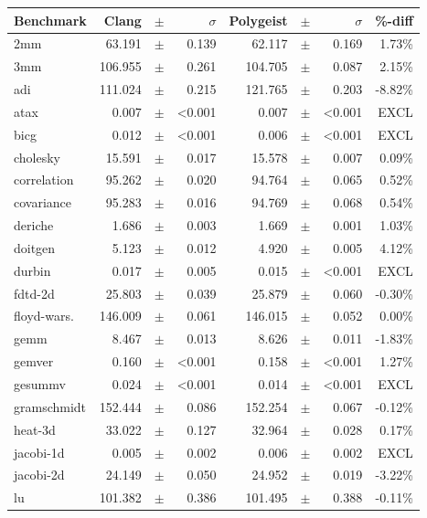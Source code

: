 \documentclass[sigplan]{acmart}
\newcommand{\tool}{Polygeist\xspace}
\begin{document}
\begin{table}
{
\footnotesize
\begin{center}
\begin{tabular}{lrp{0.08cm}rrp{0.08cm}rr}
    \toprule
    Benchmark     & Clang &$\pm$&$\sigma$   & \tool &$\pm$&$\sigma$ & \%-diff  \\ \midrule\rowcolor{aluminium1}
2mm&	63.191&$\pm$&	0.139&	62.117&$\pm$&	0.169 & 1.73\%\\
3mm&	106.955&$\pm$&	0.261&	104.705&$\pm$&	0.087& 2.15\%\\\rowcolor{aluminium1}
adi&	111.024&$\pm$&	0.215&	121.765&$\pm$&	0.203& -8.82\%\\
atax&	0.007&$\pm$&	<0.001&	0.007&$\pm$&	<0.001& EXCL\\\rowcolor{aluminium1}
bicg&	0.012&$\pm$&	<0.001&	0.006&$\pm$&	<0.001& EXCL\\
cholesky&	15.591&$\pm$&	0.017&	15.578&$\pm$&	0.007& 0.09\%\\\rowcolor{aluminium1}
correlation&	95.262&$\pm$&	0.020&	94.764&$\pm$&	0.065& 0.52\%\\
covariance&	95.283&$\pm$&	0.016&	94.769&$\pm$&	0.068& 0.54\%\\\rowcolor{aluminium1}
deriche&	1.686&$\pm$&	0.003&	1.669&$\pm$&	0.001& 1.03\%\\
doitgen&	5.123&$\pm$&	0.012&	4.920&$\pm$&	0.005& 4.12\%\\\rowcolor{aluminium1}
durbin&	0.017&$\pm$&	0.005&	0.015&$\pm$&	<0.001& EXCL\\
fdtd-2d&	25.803&$\pm$&	0.039&	25.879&$\pm$&	0.060& -0.30\%\\\rowcolor{aluminium1}
floyd-wars.&	146.009&$\pm$&	0.061&	146.015&$\pm$&	0.052& 0.00\%\\
gemm&	8.467&$\pm$&	0.013&	8.626&$\pm$&	0.011& -1.83\%\\\rowcolor{aluminium1}
gemver&	0.160&$\pm$&	<0.001&	0.158&$\pm$&	<0.001& 1.27\%\\
gesummv&	0.024&$\pm$&	<0.001&	0.014&$\pm$&	<0.001& EXCL\\\rowcolor{aluminium1}
gramschmidt&	152.444&$\pm$&	0.086&	152.254&$\pm$&	0.067& -0.12\%\\
heat-3d&	33.022&$\pm$&	0.127&	32.964&$\pm$&	0.028& 0.17\%\\\rowcolor{aluminium1}
jacobi-1d&	0.005&$\pm$&	0.002&	0.006&$\pm$&	0.002& EXCL\\
jacobi-2d&	24.149&$\pm$&	0.050&	24.952&$\pm$&	0.019& -3.22\%\\\rowcolor{aluminium1}
lu&	101.382&$\pm$&	0.386&	101.495&$\pm$&	0.388& -0.11\%\\

\end{tabular}
\end{center}}
\end{table}
\end{document}
